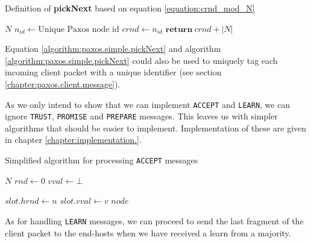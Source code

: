 \begin{algorithm}
  \caption{Definition of \textbf{pickNext} based on equation \ref{equation:crnd_mod_N}}
  \label{algorithm:paxos.simple.pickNext}
  \begin{algorithmic}
    \State $N$ 
    \State $n_{id} \gets \text{Unique Paxos node id}$
    \State $crnd \gets n_{id}$ 
    \State
      \State $\textbf{return}\ crnd + |N|$ 
    \EndFunction
  \end{algorithmic}
\end{algorithm}

Equation \ref{algorithm:paxos.simple.pickNext} and algorithm
\ref{algorithm:paxos.simple.pickNext} could also be used to uniquely tag
each incoming client packet with a unique identifier (see section
\ref{chapter:paxos.client.message}).

As we only intend to show that we can implement \texttt{ACCEPT} and
\texttt{LEARN}, we can ignore \texttt{TRUST}, \texttt{PROMISE} and
\texttt{PREPARE} messages.
%
This leaves us with simpler algorithms that should be easier to implement.
%
Implementation of these are given in chapter \ref{chapter:implementation.}.

\begin{algorithm}
  \caption{Simplified algorithm for processing \texttt{ACCEPT} messages}
  \label{algorithm:paxos.simple.acceptor}
  \begin{algorithmic}
    \State $N$
    \State $rnd \gets 0$ 
    \State $vval \gets \bot$ 
    \State

        \State $slot.hrnd\gets n$
        \State $slot.vval\gets v$ 
           \State {}
                         {$node$}
        \EndForIn
      \EndIf
    \EndOn
  \end{algorithmic}
\end{algorithm}

As for handling \texttt{LEARN} messages, we can proceed to send the last
fragment of the client packet to the end-hosts when we have received a
learn from a majority.

